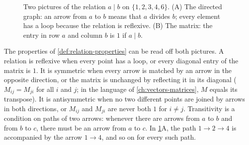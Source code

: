\begin{figure}
\hfill
{}
\caption{Two pictures of the relation $a\mid b$ on $\{1,2,3,4,6\}$. (A) The directed graph: an arrow from $a$ to $b$ means that $a$ divides $b$; every element has a loop because the relation is reflexive. (B) The matrix: the entry in row $a$ and column $b$ is $1$ if $a\mid b$.}
\label{fig:relation}
\end{figure}

The properties of \cref{def:relation-properties} can be read off both pictures. A relation is reflexive when every point has a loop, or every diagonal entry of the matrix is $1$. It is symmetric when every arrow is matched by an arrow in the opposite direction, or the matrix is unchanged by reflecting it in its diagonal ($M_{ij}=M_{ji}$ for all $i$ and $j$; in the language of \cref{ch:vectors-matrices}, $M$ equals its transpose). It is antisymmetric when no two different points are joined by arrows in both directions, or $M_{ij}$ and $M_{ji}$ are never both $1$ for $i\ne j$. Transitivity is a condition on paths of two arrows: whenever there are arrows from $a$ to $b$ and from $b$ to $c$, there must be an arrow from $a$ to $c$. In \cref{fig:relation}A, the path $1\to2\to4$ is accompanied by the arrow $1\to4$, and so on for every such path.

